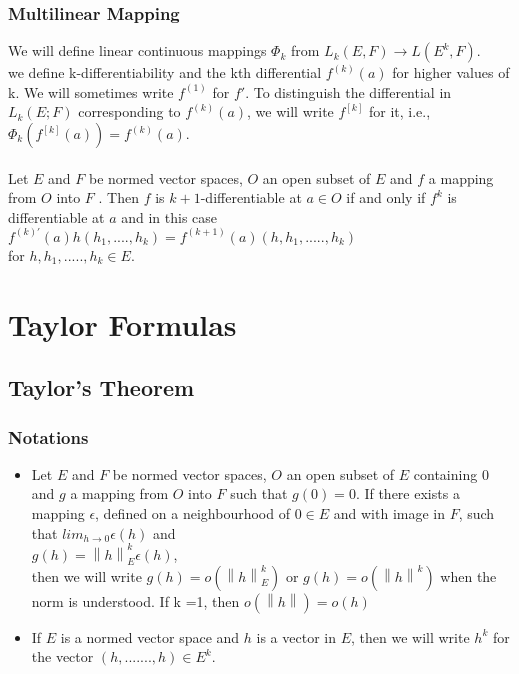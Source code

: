 \documentclass{beamer}
\newcommand\norm[1]{\left\lVert#1\right\rVert}
\begin{document}
\begin{frame}
\frametitle{Multilinear Mapping}
We will define linear continuous mappings $\Phi_k$ from $L_k (E, F) \to L(E^k, F)$. \\

we define k-differentiability and the kth differential $f^{(k)}(a)$ for higher values of k. We will sometimes write $f^{(1)}$ for $f'$. To distinguish the differential in $L_k(E; F)$  corresponding to $f^{(k)}(a)$, we will write $f^{[k]}$ for it, i.e., $\Phi_k (f^{[k]}(a)) = f^{(k)}(a)$.\\~\\
 
Let $E$ and $F$ be normed vector spaces, $O$ an open subset of $E$ and $f$ a mapping from $O$ into $F$ . Then $f$ is $k + 1$-differentiable at $a \in O$ if and only if $f^k$ is differentiable at $a$ and in this case\\
\hspace*{3cm} $f^{(k)'}(a)h(h_1,....,h_k) = f^{(k+1)}(a)(h,h_1,.....,h_k)$\\

for $h,h_1,.....,h_k \in E$.


\end{frame}
\section{Taylor Formulas}
\subsection{Taylor's Theorem}

\begin{frame}
\frametitle{Notations}
\begin{itemize}

\item Let $E$ and $F$ be normed vector spaces, $O$ an open subset of $E$ containing 0 and $g$
a mapping from $O$ into $F$ such that $g(0) = 0$. If there exists a mapping $\epsilon$, defined
on a neighbourhood of $0 \in E$ and with image in $F$, such that $lim_{h \to 0} \epsilon (h)$ and \\
\hspace*{3cm}			$g(h) = \norm{h}_E^k \epsilon(h)$,\\

then we will write $g(h) = o(\norm{h}_E^k)$ or $g(h) = o(\norm{h}^k)$ when the norm is understood. If k =1, then $o(\norm{h}) = o(h)$

\item If $E$ is a normed vector space and $h$ is a vector in $E$, then we will write $h^k$ for
the vector $(h,.......,h) \in E^k$.

\end{itemize}
\end{frame}
\end{document}
